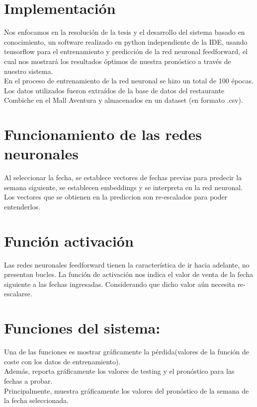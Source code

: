 \section{Implementación}
Nos enfocamos en la resolución de la tesis y el desarrollo del sistema basado en conocimiento, un software realizado en python independiente de la IDE, usando tensorflow para el entrenamiento y predicción de la red neuronal feedforward, el cual nos mostrará los resultados óptimos de nuestra pronóstico a través de nuestro sistema. \\

En el proceso de entrenamiento de la red neuronal se hizo un total de 100 épocas. Los datos utilizados fueron extraídos de la base de datos del restaurante Combiche en el Mall Aventura y almacenados en un dataset (en formato .csv).


\section{Funcionamiento de las redes neuronales}
Al seleccionar la fecha, se establece vectores de fechas previas para predecir la semana siguiente, se establecen embeddings y se interpreta en la red neuronal.
Los vectores que se obtienen en la prediccion son re-escalados para poder entenderlos.

\newpage
\section{Función activación}
Las redes neuronales feedforward tienen la característica de ir hacia adelante, no presentan bucles. La función de activación nos indica el valor de venta de la fecha siguiente a las fechas ingresadas. Considerando que dicho valor aún necesita re-escalarse.
\newpage

\section{Funciones del sistema:}

Una de las funciones es mostrar gráficamente la pérdida(valores de la función de coste con los datos de entrenamiento).\\
Además, reporta gráficamente los valores de testing y el pronóstico para las fechas a probar.\\
Principalmente, muestra gráficamente los valores del pronóstico de la semana de la fecha seleccionada.

\newpage


